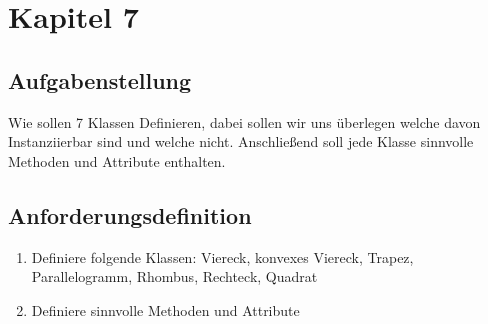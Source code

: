 \section{Kapitel 7}
\subsection{Aufgabenstellung}
Wie sollen 7 Klassen Definieren, dabei sollen wir uns überlegen welche davon Instanziierbar sind und welche
nicht. Anschlie\ss end soll jede Klasse sinnvolle Methoden und Attribute enthalten.

\subsection{Anforderungsdefinition}
\begin{enumerate}
	\item Definiere folgende Klassen: Viereck, konvexes Viereck, Trapez, Parallelogramm, Rhombus, Rechteck, Quadrat
	\item Definiere sinnvolle Methoden und Attribute
\end{enumerate}

